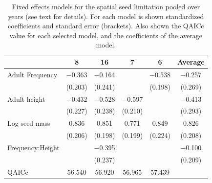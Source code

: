 \documentclass[A4]{article}
\begin{document}
%

\begin{table}
\caption{Fixed effects models for the spatial seed limitation pooled
  over years (see text for details). For each model is shown
  standardized coefficients and standard error (brackets). Also shown
  the QAICc value for each selected model, and the coefficients of the
  average model.}
\centering
\begin{tabular}[t]{lccccc}
\toprule
  & 8 & 16 & 7 & 6 & Average\\
\midrule
Adult Frequency & \num{-0.363} & \num{-0.164} &  & \num{-0.538} & \num{-0.257}\\
 & (\num{0.203}) & (\num{0.241}) &  & (\num{0.198}) & (\num{0.269})\\
Adult height & \num{-0.432} & \num{-0.528} & \num{-0.597} &  & \num{-0.413}\\
 & (\num{0.227}) & (\num{0.238}) & (\num{0.210}) &  & (\num{0.293})\\
Log seed mass & \num{0.836} & \num{0.851} & \num{0.771} & \num{0.849} & \num{0.826}\\
 & (\num{0.206}) & (\num{0.198}) & (\num{0.199}) & (\num{0.224}) & (\num{0.208})\\
Frequency:Height &  & \num{-0.395} &  &  & \num{-0.100}\\
 &  & (\num{0.237}) &  &  & (\num{0.209})\\
\midrule
QAICc & \num{56.540} & \num{56.920} & \num{56.965} & \num{57.439} & \\
\bottomrule
\end{tabular}
\label{tab:SSL_glm}
\end{table}
\end{document}
